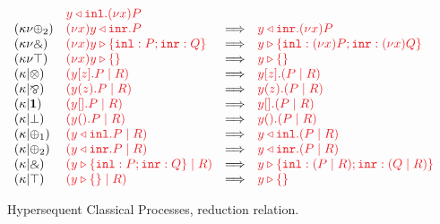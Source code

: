 \documentclass[draft,submission,copyright,creativecommons]{eptcs}
\begin{document}
\begin{figure}
\[\begin{array}{llcll}
      & \tm{\cpInl{y}{\piNew{x}{P}}}
      \\
      \hccpRedKappaNuPlus2
      & \tm{\piNew{x}{\cpInr{y}{P}}}
      & \Longrightarrow
      & \tm{\cpInr{y}{\piNew{x}{P}}}
      \\
      \hccpRedKappaNuWith
      & \tm{\piNew{x}{\cpCase{y}{P}{Q}}}
      & \Longrightarrow
      & \tm{\cpCase{y}{\piNew{x}{P}}{\piNew{x}{Q}}}
      \\
      \hccpRedKappaNuTop
      & \tm{\piNew{x}{\cpAbsurd{y}}}
      & \Longrightarrow
      & \tm{\cpAbsurd{y}}
      \\
      \hccpRedKappaMixTens
      & \tm{(\piPar{\piBoundSend{y}{z}{P}}{R})}
      & \Longrightarrow
      & \tm{\piBoundSend{y}{z}{(\piPar{P}{R})}}
      \\
      \hccpRedKappaMixParr
      & \tm{(\piPar{\piRecv{y}{z}{P}}{R})}
      & \Longrightarrow
      & \tm{\piRecv{y}{z}{(\piPar{P}{R})}}
      \\
      \hccpRedKappaMixOne
      & \tm{(\piPar{\piBoundSend{y}{}{P}}{R})}
      & \Longrightarrow
      & \tm{\piBoundSend{y}{}{(\piPar{P}{R})}}
      \\
      \hccpRedKappaMixBot
      & \tm{(\piPar{\piRecv{y}{}{P}}{R})}
      & \Longrightarrow
      & \tm{\piRecv{y}{}{(\piPar{P}{R})}}
      \\
      \hccpRedKappaMixPlus1
      & \tm{(\piPar{\cpInl{y}{P}}{R})}
      & \Longrightarrow
      & \tm{\cpInl{y}{(\piPar{P}{R})}}
      \\
      \hccpRedKappaMixPlus2
      & \tm{(\piPar{\cpInr{y}{P}}{R})}
      & \Longrightarrow
      & \tm{\cpInr{y}{(\piPar{P}{R})}}
      \\
      \hccpRedKappaMixWith
      & \tm{(\piPar{\cpCase{y}{P}{Q}}{R})}
      & \Longrightarrow
      & \tm{\cpCase{y}{(\piPar{P}{R})}{(\piPar{Q}{R})}}
      \\
      \hccpRedKappaMixTop
      & \tm{(\piPar{\cpAbsurd{y}}{R})}
      & \Longrightarrow
      & \tm{\cpAbsurd{y}}
    \end{array}
  \]
  \begin{center}
    \begin{prooftree*}
      \SYM{\hccpRedGammaNew}
    \end{prooftree*}
    \begin{prooftree*}
      \SYM{\hccpRedGammaMix}
    \end{prooftree*}
    \begin{prooftree*}
      \SYM{\hccpRedGammaEquiv}
    \end{prooftree*}
  \end{center}
  \caption{Hypersequent Classical Processes, reduction relation.}
  \label{fig:hcp-reduction}
\end{figure}
\end{document}
